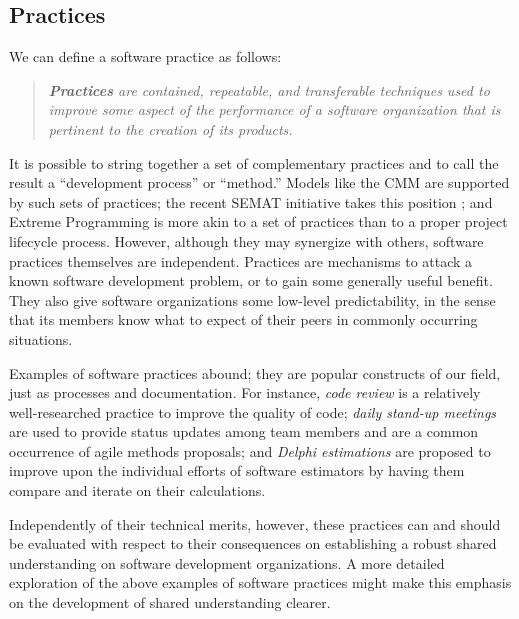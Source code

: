 \subsection{Practices}
\label{sec:Practices}

We can define a software practice as follows:

\begin{quote}
\emph{\textbf{Practices} are contained, repeatable, and transferable techniques used to improve some aspect of the performance of a software organization that is pertinent to the creation of its products.}
\end{quote}

It is possible to string together a set of complementary practices and to call the result a ``development process'' or ``method.'' Models like the CMM are supported by such sets of practices; the recent SEMAT initiative takes this position \cite{Jacobson2009}; and Extreme Programming is more akin to a set of practices than to a proper project lifecycle process. However, although they may synergize with others, software practices themselves are independent. Practices are mechanisms to attack a known software development problem, or to gain some generally useful benefit. They also give software organizations some low-level predictability, in the sense that its members know what to expect of their peers in commonly occurring situations.

Examples of software practices abound; they are popular constructs of our field, just as processes and documentation. For instance, \emph{code review} is a relatively well-researched practice to improve the quality of code; \emph{daily stand-up meetings} are used to provide status updates among team members and are a common occurrence of agile methods proposals; and \emph{Delphi estimations} are proposed to improve upon the individual efforts of software estimators by having them compare and iterate on their calculations.

Independently of their technical merits, however, these practices can and should be evaluated with respect to their consequences on establishing a robust shared understanding on software development organizations. A more detailed exploration of the above examples of software practices might make this emphasis on the development of shared understanding clearer.

